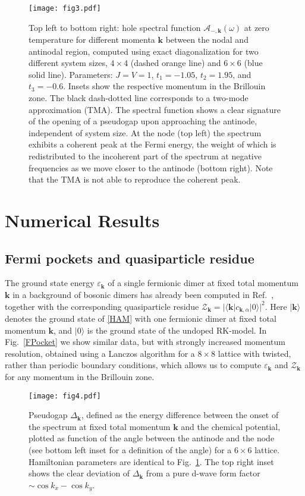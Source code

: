 \documentclass[aps,pra,reprint,showpacs,superscriptaddress]{revtex4-1}
\begin{document}
\begin{figure*}
\centering
\texttt{[image: fig3.pdf]} 
\caption{ Top left to bottom right: hole spectral function $\mathcal{A}_{-,\mathbf{k}}(\omega)$ at zero temperature for different momenta $\mathbf{k}$ between the nodal and antinodal region, computed using exact diagonalization for two different system sizes, $4\times4$ (dashed orange line) and $6\times6$ (blue solid line). Parameters:  $J=V=1$, $t_1=-1.05$, $t_2=1.95$, and $t_3=-0.6$. Insets show the respective momentum in the Brillouin zone. The black dash-dotted line corresponds to a two-mode approximation (TMA). The spectral function shows a clear signature of the opening of a pseudogap upon approaching the antinode, independent of system size. At the node (top left) the spectrum exhibits a coherent peak at the Fermi energy, the weight of which is redistributed to the incoherent part of the spectrum at negative frequencies as we move closer to the antinode (bottom right). Note that the TMA is not able to reproduce the coherent peak.}
\label{FSpectral}
\end{figure*} 

\section{Numerical Results}\label{Pocket}

\subsection{Fermi pockets and quasiparticle residue}

The ground state energy $\varepsilon_\mathbf{k}$ of a single fermionic dimer at fixed total momentum $\mathbf{k}$ in a background of bosonic dimers has already been computed in Ref.~\cite{punk2015quantum}, together with the corresponding quasiparticle residue $\mathcal{Z}_\mathbf{k} =  |\langle \mathbf{k}| c_{\mathbf{k},\alpha} |0\rangle|^2$. Here $|\mathbf{k}\rangle$ denotes the ground state of \eqref{HAM} with one fermionic dimer at fixed total momentum $\mathbf{k}$, and $|0\rangle$ is the ground state of the undoped RK-model. In Fig.~\ref{FPocket} we show similar data, but with strongly increased momentum resolution, obtained using a Lanczos algorithm for a $8\times8$ lattice with twisted, rather than periodic boundary conditions, which allows us to compute $\varepsilon_\mathbf{k}$ and $\mathcal{Z}_\mathbf{k}$ for any momentum in the Brillouin zone.

\begin{figure*}
\centering
\texttt{[image: fig4.pdf]}
\caption{Pseudogap $\Delta_\mathbf{k}$, defined as the energy difference between the onset of the spectrum at fixed total momentum $\mathbf{k}$ and the chemical potential, plotted as function of the angle between the antinode and the node (see bottom left inset for a definition of the angle) for a $6\times6$ lattice. Hamiltonian parameters are identical to Fig.~\ref{FSpectral}.
The top right inset shows the clear deviation of $\Delta_\mathbf{k}$ from a pure d-wave form factor $\sim \cos k_x -\cos k_y$. }
\label{Gap}
\end{figure*}
\end{document}
